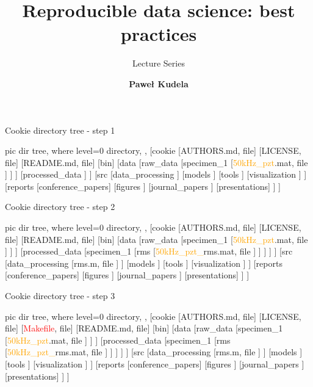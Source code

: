 \documentclass[10pt,aspectratio=169]{beamer} %
\date{}
\title{Reproducible data science: best practices}
\subtitle{Lecture Series}
\author{\textbf{Paweł Kudela} }
\institute{Institute of Fluid Flow Machinery\\Polish Academy of Sciences \\ \vspace{-1.5cm}\flushright %
\texttt{[image: /pkudela\_odroid\_sensors/MISD\_shared/logo/logo\_eng\_40mm.eps]}}
\begin{document}
\begin{frame}[t]{Cookie directory tree - step 1}
\centering
	\begin{forest}
		pic dir tree,
		where level=0{}{%
			directory,
		},
		[cookie
		[AUTHORS.md, file]
		[LICENSE, file]
		[README.md, file]
		[bin]
		[data
		[raw\_data
			[specimen\_1
				[\textcolor{orange}{50kHz\_pzt}.mat, file
				]
			]
		]
		[processed\_data
		]
		]
		[src
			[data\_processing
			]
			[models
			]
			[tools
			]
			[visualization
			]
		]
		[reports
			[conference\_papers]	
			[figures
			]
			[journal\_papers
			]
			[presentations]
		]
		]
	\end{forest}
\end{frame}
\begin{frame}[t]{Cookie directory tree - step 2}
\centering
	\begin{forest}
		pic dir tree,
		where level=0{}{%
			directory,
		},
		[cookie
		[AUTHORS.md, file]
		[LICENSE, file]
		[README.md, file]
		[bin]
		[data
		[raw\_data
			[specimen\_1
				[\textcolor{orange}{50kHz\_pzt}.mat, file
				]
			]
		]
		[processed\_data
			[specimen\_1
				[\alert{rms}
					[\textcolor{orange}{50kHz\_pzt\_}\alert{rms}.mat, file
					]
				]
			]
		]
		]
		[src
			[data\_processing
				[\alert{rms}.m, file
				]
			]
			[models
			]
			[tools
			]
			[visualization
			]
		]
		[reports
			[conference\_papers]	
			[figures
			]
			[journal\_papers
			]
			[presentations]
		]
		]
	\end{forest}
\end{frame}
\begin{frame}[t]{Cookie directory tree - step 3}
\centering
	\begin{forest}
		pic dir tree,
		where level=0{}{%
			directory,
		},
		[cookie
		[AUTHORS.md, file]
		[LICENSE, file]
		[\textcolor{red}{Makefile}, file]
		[README.md, file]
		[bin]
		[data
		[raw\_data
			[specimen\_1
				[\textcolor{orange}{50kHz\_pzt}.mat, file
				]
			]
		]
		[processed\_data
			[specimen\_1
				[\alert{rms}
					[\textcolor{orange}{50kHz\_pzt\_}\alert{rms}.mat, file
					]
				]
			]
		]
		]
		[src
			[data\_processing
				[\alert{rms}.m, file
				]
			]
			[models
			]
			[tools
			]
			[visualization
			]
		]
		[reports
			[conference\_papers]	
			[figures
			]
			[journal\_papers
			]
			[presentations]
		]
		]
	\end{forest}
\end{frame}
\end{document}
